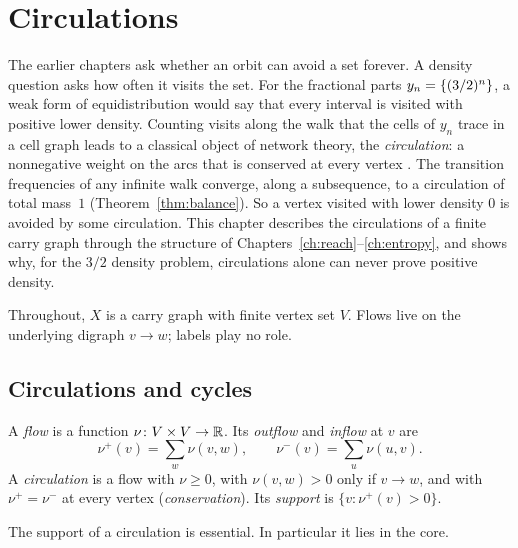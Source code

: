 \chapter{Circulations}\label{ch:flows}

The earlier chapters ask whether an orbit can avoid a set forever. A density question asks how
often it visits the set. For the fractional parts \(y_n=\{(3/2)^n\}\), a weak form of
equidistribution would say that every interval is visited with positive lower density. Counting
visits along the walk that the cells of \(y_n\) trace in a cell graph leads to a classical
object of network theory, the \emph{circulation}: a nonnegative weight on the arcs that is
conserved at every vertex \cite[ch.~3]{BJG09}. The transition frequencies of any infinite walk
converge, along a subsequence, to a circulation of total mass~\(1\)
(Theorem~\ref{thm:balance}). So a vertex visited with lower density \(0\) is avoided by some
circulation. This chapter describes the circulations of a finite carry graph through the
structure of Chapters~\ref{ch:reach}--\ref{ch:entropy}, and shows why, for the \(3/2\) density
problem, circulations alone can never prove positive density.

Throughout, \(X\) is a carry graph with finite vertex set \(V\). Flows live on the underlying
digraph \(v\to w\); labels play no role.

\section{Circulations and cycles}

\begin{definition}\label{def:circulation}
A \emph{flow} is a function \(\nu\colon V\times V\to\mathbb{R}\). Its \emph{outflow} and
\emph{inflow} at \(v\) are
\[
  \nu^+(v)=\sum_{w}\nu(v,w),\qquad \nu^-(v)=\sum_{u}\nu(u,v).
\]
A \emph{circulation} is a flow with \(\nu\ge0\), with \(\nu(v,w)>0\) only if
\(v\to w\), and with \(\nu^+=\nu^-\) at every vertex (\emph{conservation}). Its
\emph{support} is \(\{v:\nu^+(v)>0\}\).
\end{definition}

\begin{proposition}\label{prop:flow-essential}
The support of a circulation is essential. In particular it lies in the core.
\end{proposition}

